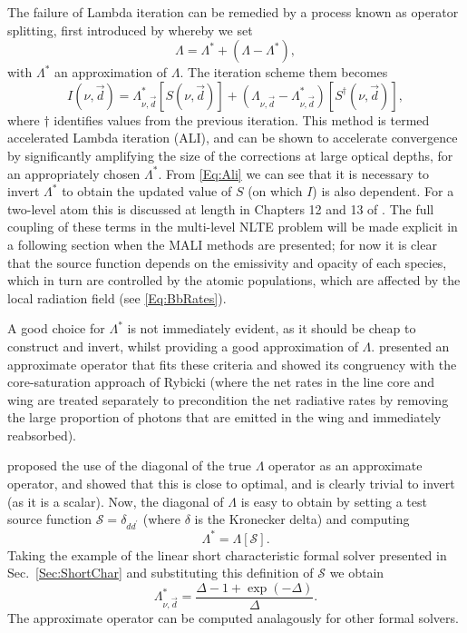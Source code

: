 The failure of Lambda iteration can be remedied by a process known as operator splitting, first introduced by \citet{Cannon1973} whereby we set
\begin{equation}
    \Lambda = \Lambda^* + (\Lambda - \Lambda^*),
\end{equation}
with $\Lambda^*$ an approximation of $\Lambda$. The iteration scheme them becomes
\begin{equation}
    I(\nu, \vec{d}) = \Lambda_{\nu, \vec{d}}^*[S(\nu, \vec{d})] + (\Lambda_{\nu, \vec{d}} - \Lambda_{\nu, \vec{d}}^*)[S^{\dagger}(\nu, \vec{d})],
    \label{Eq:Ali}
\end{equation}
where $\dagger$ identifies values from the previous iteration. This method is termed accelerated Lambda iteration (ALI), and can be shown to accelerate convergence by significantly amplifying the size of the corrections at large optical depths, for an appropriately chosen $\Lambda^*$.
From \eqref{Eq:Ali} we can see that it is necessary to invert $\Lambda^*$ to obtain the updated value of $S$ (on which $I$) is also dependent. For a two-level atom this is discussed at length in Chapters 12 and 13 of \citet{Hubeny2014}.
The full coupling of these terms in the multi-level NLTE problem will be made explicit in a following section when the MALI methods are presented; for now it is clear that the source function depends on the emissivity and opacity of each species, which in turn are controlled by the atomic populations, which are affected by the local radiation field (see \eqref{Eq:BbRates}).

A good choice for $\Lambda^*$ is not immediately evident, as it should be cheap to construct and invert, whilst providing a good approximation of $\Lambda$. \citet{Scharmer1981} presented an approximate operator that fits these criteria and showed its congruency with the core-saturation approach of Rybicki \NeedRef{} (where the net rates in the line core and wing are treated separately to precondition the net radiative rates by removing the large proportion of photons that are emitted in the wing and immediately reabsorbed).

\citet{Olson1986} proposed the use of the diagonal of the true $\Lambda$ operator as an approximate operator, and showed that this is close to optimal, and is clearly trivial to invert (as it is a scalar). Now, the diagonal of $\Lambda$ is easy to obtain by setting a test source function $\mathcal{S}=\delta_{dd^\prime}$ (where $\delta$ is the Kronecker delta) and computing
\begin{equation}
    \Lambda^* = \Lambda[\mathcal{S}].
\end{equation}
Taking the example of the linear short characteristic formal solver presented in Sec.~\ref{Sec:ShortChar} and substituting this definition of $\mathcal{S}$ we obtain
\begin{equation}
    \Lambda^*_{\nu, \vec{d}} = \frac{\Delta - 1 + \exp(-\Delta)}{\Delta}.
\end{equation}
The approximate operator can be computed analagously for other formal solvers.

